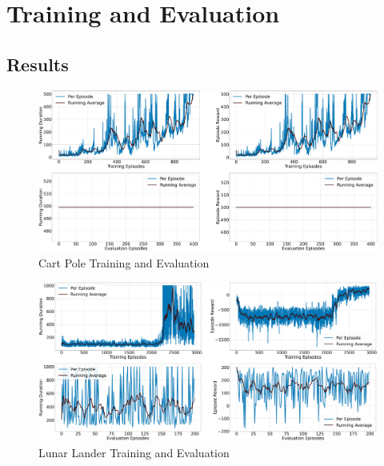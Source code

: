 \documentclass{article} %
\begin{document}
\section{Training and Evaluation}

\subsection{Results}
\begin{figure}[H]
    \begin{center}
        \includegraphics[width=\textwidth]{qac_cartpole.png}
    \end{center}
    \caption{Cart Pole Training and Evaluation}
\end{figure}

\begin{figure}[H]
    \begin{center}
        \includegraphics[width=\textwidth]{qac_lunar.png}
    \end{center}
    \caption{Lunar Lander Training and Evaluation}
\end{figure}
\end{document}
